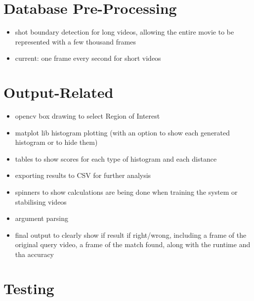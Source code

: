 \section{Database Pre-Processing}

\begin{itemize}
    \item shot boundary detection for long videos, allowing the entire movie to be represented with a few thousand frames
    \item current: one frame every second for short videos
\end{itemize}


\section{Output-Related}

\begin{itemize}
    \item opencv box drawing to select Region of Interest
    \item matplot lib histogram plotting (with an option to show each generated histogram or to hide them)
    \item tables to show scores for each type of histogram and each distance
    \item exporting results to CSV for further analysis
    \item spinners to show calculations are being done when training the system or stabilising videos 
    \item argument parsing
    \item final output to clearly show if result if right/wrong, including a frame of the original query video, a frame of the match found, along with the runtime and tha accuracy
\end{itemize}


\section{Testing}

